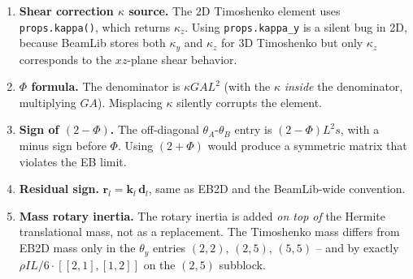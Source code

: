 \documentclass[11pt,a4paper]{article}
\newcommand{\bmath}[1]{\boldsymbol{#1}}
\begin{document}
\begin{enumerate}
    \item \textbf{Shear correction $\kappa$ source.} The 2D Timoshenko element uses \texttt{props.kappa()}, which returns $\kappa_z$. Using \texttt{props.kappa\_y} is a silent bug in 2D, because BeamLib stores both $\kappa_y$ and $\kappa_z$ for 3D Timoshenko but only $\kappa_z$ corresponds to the $xz$-plane shear behavior.
    \item \textbf{$\Phi$ formula.} The denominator is $\kappa GA L^2$ (with the $\kappa$ \emph{inside} the denominator, multiplying $GA$). Misplacing $\kappa$ silently corrupts the element.
    \item \textbf{Sign of $(2 - \Phi)$.} The off-diagonal $\theta_A$-$\theta_B$ entry is $(2 - \Phi) L^2 s$, with a minus sign before $\Phi$. Using $(2 + \Phi)$ would produce a symmetric matrix that violates the EB limit.
    \item \textbf{Residual sign.} $\bmath{r}_l = \bmath{k}_l\,\bmath{d}_l$, same as EB2D and the BeamLib-wide convention.
    \item \textbf{Mass rotary inertia.} The rotary inertia is added \emph{on top of} the Hermite translational mass, not as a replacement. The Timoshenko mass differs from EB2D mass only in the $\theta_y$ entries $(2, 2)$, $(2, 5)$, $(5, 5)$ -- and by exactly $\rho I L / 6 \cdot [[2,1],[1,2]]$ on the $(2, 5)$ subblock.
\end{enumerate}
\end{document}
